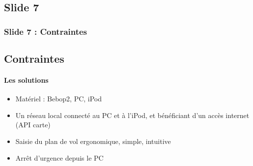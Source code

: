 \documentclass{beamer}
\begin{document}
	\begin{frame}
	\section{Slide 7}
		\begin{center}
		\frametitle{Slide 7 : Contraintes}
		\subsection{Contraintes}
        \framesubtitle{Les solutions}
            \begin{itemize}
                \item Matériel : Bebop2, PC, iPod
                \item Un réseau local connecté au PC et à l'iPod, et bénéficiant d'un accès internet (API carte)
                \item Saisie du plan de vol ergonomique, simple, intuitive
                \item Arrêt d'urgence depuis le PC
            \end{itemize}
		\end{center}
	\end{frame}

	
\end{document}
